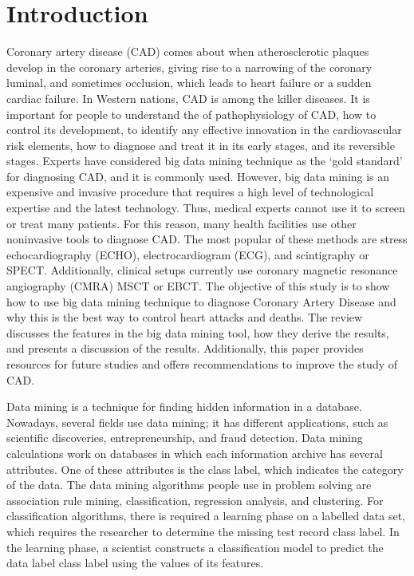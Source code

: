 \documentclass[sigconf]{acmart}
\begin{document}
\section{Introduction}
Coronary artery disease (CAD) comes about when atherosclerotic plaques develop in the coronary arteries, giving rise to a narrowing of the coronary luminal, and sometimes occlusion, which leads to heart failure or a sudden cardiac failure.
In Western nations, CAD is among the killer diseases.
It is important for people to understand the of pathophysiology of CAD, how to control its development, to identify any effective innovation in the cardiovascular risk elements, how to diagnose and treat it in its early stages, and its reversible stages.
Experts have considered big data mining technique as the `gold standard' for diagnosing CAD, and it is commonly used.
However, big data mining is an expensive and invasive procedure that requires a high level of technological expertise and the latest technology. Thus, medical experts cannot use it to screen or treat many patients.
 For this reason, many health facilities use other noninvasive tools to diagnose CAD.
The most popular of these methods are stress echocardiography (ECHO), electrocardiogram (ECG), and scintigraphy or SPECT.
Additionally, clinical setups currently use coronary magnetic resonance angiography (CMRA) MSCT or EBCT.
The objective of this study is to show how to use big data mining technique to diagnose Coronary Artery Disease and why this is the best way to control heart attacks and deaths.
The review discusses the features in the big data mining tool, how they derive the results, and presents a discussion of the results.
Additionally, this paper provides resources for future studies and offers recommendations to improve the study of CAD.
\par Data mining is a technique for finding hidden information in a database.
Nowadays, several fields use data mining; it has different applications, such as scientific discoveries, entrepreneurship, and fraud detection.
Data mining calculations work on databases in which each information archive has several attributes.
 One of these attributes is the class label, which indicates the category of the data.
The data mining algorithms people use in problem solving are association rule mining, classification, regression analysis, and clustering.
For classification algorithms, there is required a learning phase on a labelled data set, which requires the researcher to determine the missing test record class label.
In the learning phase, a scientist constructs a classification model to predict the data label class label using the values of its features.
\end{document}
